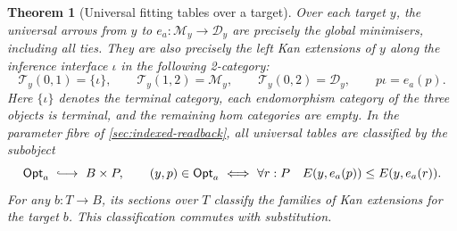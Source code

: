 \documentclass[11pt,a4paper]{article}
\newtheorem{theorem}{Theorem}[section]
\theoremstyle{definition}
\theoremstyle{remark}\newaliascnt{remark}{theorem}
\numberwithin{equation}{section}
\begin{document}
\begin{theorem}[Universal fitting tables over a target]\label{thm:fit-kan}
Over each target \(y\), the universal arrows from \(y\) to \(e_a:\mathcal M_y\to\mathcal D_y\) are precisely the global minimisers, including all ties. They are also precisely the left Kan extensions of \(y\) along the inference interface \(\iota\) in the following 2-category:
\[
 \mathcal T_y(0,1)=\{\iota\},\qquad
 \mathcal T_y(1,2)=\mathcal M_y,\qquad
 \mathcal T_y(0,2)=\mathcal D_y,\qquad p\iota=e_a(p).
\]
Here \(\{\iota\}\) denotes the terminal category, each endomorphism category of the three objects is terminal, and the remaining hom categories are empty. In the parameter fibre of \cref{sec:indexed-readback}, all universal tables are classified by the subobject
\[
 \mathsf{Opt}_a\ \lhook\joinrel\longrightarrow\ B\times P,\qquad
 (y,p)\in\mathsf{Opt}_a\ \Longleftrightarrow\
       \forall r:P\quad E(y,e_a(p))\le E(y,e_a(r)).
\]
For any \(b:T\to B\), its sections over \(T\) classify the families of Kan extensions for the target \(b\). This classification commutes with substitution.
\end{theorem}
\end{document}
